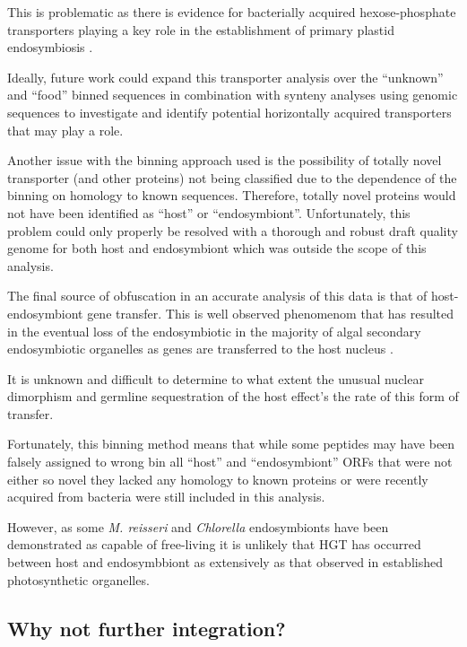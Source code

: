 {{This is problematic as there is evidence for bacterially acquired 
hexose-phosphate transporters playing a key role in the 
establishment of primary plastid endosymbiosis \citep{Price2012,Karkar2015a}.

Ideally, future work could expand this transporter analysis over the 
``unknown'' and ``food'' binned sequences in combination with synteny
analyses using genomic sequences to investigate and identify
potential horizontally acquired transporters that may play a role.

Another issue with the binning approach used is the possibility
of totally novel transporter (and other proteins) not being classified
due to the dependence of the binning on homology to known sequences.
Therefore, totally novel proteins would not have been identified as 
``host'' or ``endosymbiont''.  Unfortunately, this problem 
could only properly be resolved with a thorough and robust 
draft quality genome for both host and endosymbiont which was outside
the scope of this analysis. 

The final source of obfuscation in an accurate analysis of this data
is that of host-endosymbiont gene transfer.  
This is well observed phenomenom that has resulted in the eventual loss
of the endosymbiotic in the majority of algal secondary endosymbiotic organelles
as genes are transferred to the host nucleus
\citep{Keeling2008a,Archibald2005,Keeling2004}.

It is unknown and difficult to determine to what extent the 
unusual nuclear dimorphism and germline sequestration of the host 
effect's the rate of this form of transfer. 

Fortunately, this binning method means that while some peptides
may have been falsely assigned to wrong bin all ``host'' and
``endosymbiont'' ORFs that were not either so novel they lacked
any homology to known proteins or were recently acquired from
bacteria were still included in this analysis. 

However, as some \textit{M. reisseri} and \textit{Chlorella} endosymbionts 
have been demonstrated as capable of free-living it is unlikely
that HGT has occurred between host and endosymbbiont as extensively
as that observed in established photosynthetic organelles. 



\subsection{Why not further integration?}

}}
